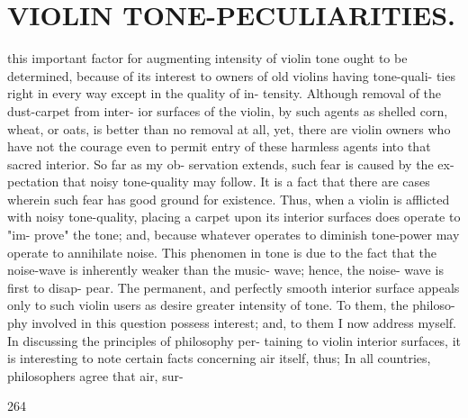 \documentclass{article}
\begin{document}
\section*{VIOLIN TONE-PECULIARITIES.}
this important factor for augmenting intensity of violin tone ought to be determined, because of its interest to owners of old violins having tone-quali- ties right in every way except in the quality of in- tensity. Although removal of the dust-carpet from inter- ior surfaces of the violin, by such agents as shelled corn, wheat, or oats, is better than no removal at all, yet, there are violin owners who have not the courage even to permit entry of these harmless agents into that sacred interior. So far as my ob- servation extends, such fear is caused by the ex- pectation that noisy tone-quality may follow. It is a fact that there are cases wherein such fear has good ground for existence. Thus, when a violin is afflicted with noisy tone-quality, placing a carpet upon its interior surfaces does operate to "im- prove" the tone; and, because whatever operates to diminish tone-power may operate to annihilate noise. This phenomen in tone is due to the fact that the noise-wave is inherently weaker than the music- wave; hence, the noise- wave is first to disap- pear. The permanent, and perfectly smooth interior surface appeals only to such violin users as desire greater intensity of tone. To them, the philoso- phy involved in this question possess interest; and, to them I now address myself. In discussing the principles of philosophy per- taining to violin interior surfaces, it is interesting to note certain facts concerning air itself, thus; In all countries, philosophers agree that air, sur-

264
\end{document}
